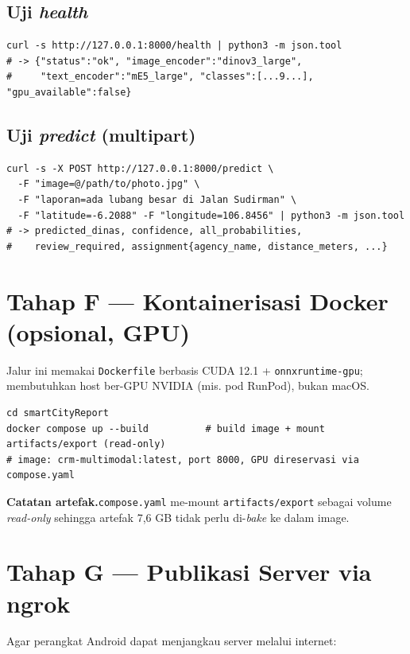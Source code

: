 \documentclass[11pt,a4paper]{article}
\newcommand{\code}[1]{\texttt{\small #1}}
\newcommand{\stage}[2]{%
  \par\medskip\noindent\colorbox{stagebg}{\parbox{\dimexpr\linewidth-2\fboxsep}{%
  \textbf{\color{accent}#1}\;\;#2}}\par\smallskip}
\begin{document}
\subsection{Uji \emph{health}}
\begin{lstlisting}
curl -s http://127.0.0.1:8000/health | python3 -m json.tool
# -> {"status":"ok", "image_encoder":"dinov3_large",
#     "text_encoder":"mE5_large", "classes":[...9...], "gpu_available":false}
\end{lstlisting}

\subsection{Uji \emph{predict} (multipart)}
\begin{lstlisting}
curl -s -X POST http://127.0.0.1:8000/predict \
  -F "image=@/path/to/photo.jpg" \
  -F "laporan=ada lubang besar di Jalan Sudirman" \
  -F "latitude=-6.2088" -F "longitude=106.8456" | python3 -m json.tool
# -> predicted_dinas, confidence, all_probabilities,
#    review_required, assignment{agency_name, distance_meters, ...}
\end{lstlisting}

\section{Tahap F — Kontainerisasi Docker (opsional, GPU)}
Jalur ini memakai \code{Dockerfile} berbasis CUDA 12.1 + \code{onnxruntime-gpu};
membutuhkan host ber-GPU NVIDIA (mis. pod RunPod), bukan macOS.

\begin{lstlisting}
cd smartCityReport
docker compose up --build          # build image + mount artifacts/export (read-only)
# image: crm-multimodal:latest, port 8000, GPU direservasi via compose.yaml
\end{lstlisting}

\stage{Catatan artefak.}{\code{compose.yaml} me-mount \code{artifacts/export} sebagai volume \emph{read-only} sehingga artefak 7{,}6 GB tidak perlu di-\emph{bake} ke dalam image.}

\section{Tahap G — Publikasi Server via ngrok}
Agar perangkat Android dapat menjangkau server melalui internet:
\end{document}
